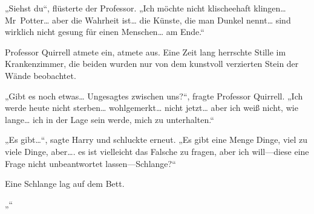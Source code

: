 „Siehst du“, flüsterte der Professor. „Ich möchte nicht klischeehaft klingen… Mr~Potter… aber die Wahrheit ist… die Künste, die man Dunkel nennt… sind wirklich nicht gesung für einen Menschen… am Ende.“

Professor Quirrell atmete ein, atmete aus.
Eine Zeit lang herrschte Stille im Krankenzimmer, die beiden wurden nur von dem kunstvoll verzierten Stein der Wände beobachtet.

„Gibt es noch etwas… Ungesagtes zwischen uns?“, fragte Professor Quirrell. „Ich werde heute nicht sterben… wohlgemerkt… nicht jetzt… aber ich weiß nicht, wie lange… ich in der Lage sein werde, mich zu unterhalten.“

„Es gibt…“, sagte Harry und schluckte erneut.
„Es gibt eine Menge Dinge, viel zu viele Dinge, aber…. es ist vielleicht das Falsche zu fragen, aber ich will—diese eine Frage nicht unbeantwortet lassen—Schlange?“

Eine Schlange lag auf dem Bett.

„“

